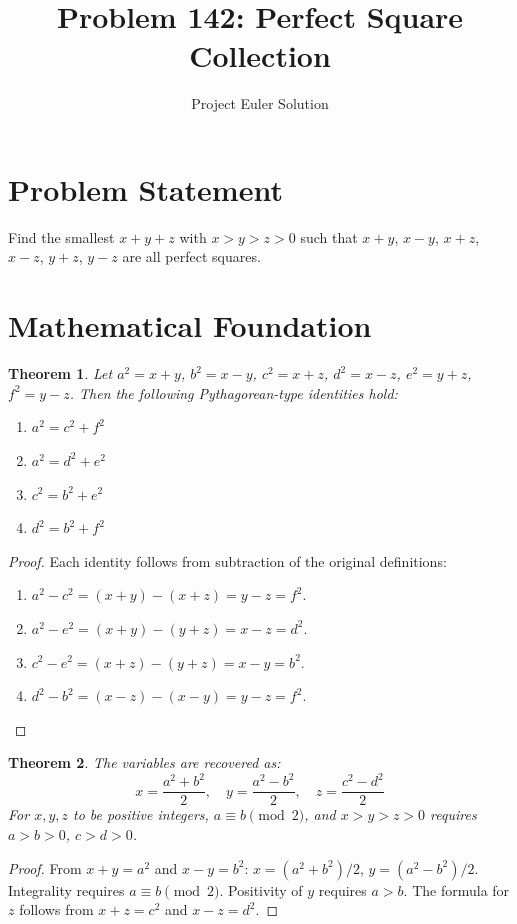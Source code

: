 \documentclass[12pt]{article}
\title{Problem 142: Perfect Square Collection}
\author{Project Euler Solution}
\date{}
\newtheorem{theorem}{Theorem}
\begin{document}
\maketitle

\section{Problem Statement}
Find the smallest $x+y+z$ with $x > y > z > 0$ such that $x+y$, $x-y$, $x+z$, $x-z$, $y+z$, $y-z$ are all perfect squares.

\section{Mathematical Foundation}

\begin{theorem}
Let $a^2 = x+y$, $b^2 = x-y$, $c^2 = x+z$, $d^2 = x-z$, $e^2 = y+z$, $f^2 = y-z$. Then the following Pythagorean-type identities hold:
\begin{enumerate}
    \item $a^2 = c^2 + f^2$
    \item $a^2 = d^2 + e^2$
    \item $c^2 = b^2 + e^2$
    \item $d^2 = b^2 + f^2$
\end{enumerate}
\end{theorem}

\begin{proof}
Each identity follows from subtraction of the original definitions:
\begin{enumerate}
    \item $a^2 - c^2 = (x+y) - (x+z) = y - z = f^2$.
    \item $a^2 - e^2 = (x+y) - (y+z) = x - z = d^2$.
    \item $c^2 - e^2 = (x+z) - (y+z) = x - y = b^2$.
    \item $d^2 - b^2 = (x-z) - (x-y) = y - z = f^2$.
\end{enumerate}
\end{proof}

\begin{theorem}
The variables are recovered as:
\[
x = \frac{a^2 + b^2}{2}, \quad y = \frac{a^2 - b^2}{2}, \quad z = \frac{c^2 - d^2}{2}
\]
For $x,y,z$ to be positive integers, $a \equiv b \pmod{2}$, and $x > y > z > 0$ requires $a > b > 0$, $c > d > 0$.
\end{theorem}

\begin{proof}
From $x+y = a^2$ and $x-y = b^2$: $x = (a^2+b^2)/2$, $y = (a^2-b^2)/2$. Integrality requires $a \equiv b \pmod{2}$. Positivity of $y$ requires $a > b$. The formula for $z$ follows from $x+z = c^2$ and $x-z = d^2$.
\end{proof}
\end{document}
